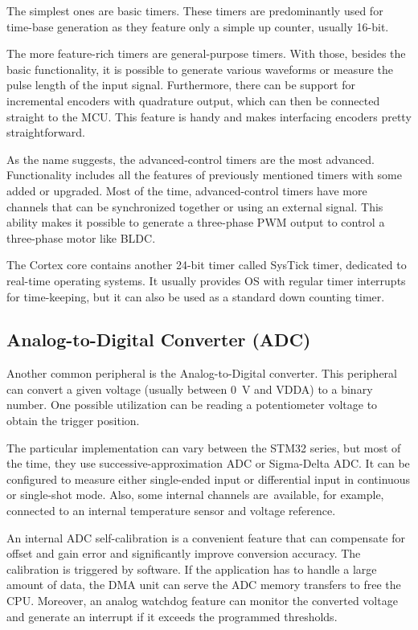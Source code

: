 The simplest ones are basic timers. These timers are predominantly used for time-base generation as they feature only a simple up counter, usually 16-bit.

The more feature-rich timers are general-purpose timers. With those, besides the basic functionality, it is possible to generate various waveforms or measure the pulse length of the input signal. Furthermore, there can be support for incremental encoders with quadrature output, which can then be connected straight to the MCU. This feature is handy and makes interfacing encoders pretty straightforward.

As the name suggests, the advanced-control timers are the most advanced. Functionality includes all the features of previously mentioned timers with some added or upgraded. Most of the time, advanced-control timers have more channels that can be synchronized together or using an external signal. This ability makes it possible to generate a three-phase PWM output to control a three-phase motor like BLDC.

The Cortex core contains another 24-bit timer called SysTick timer, dedicated to real-time operating systems. It usually provides OS with regular timer interrupts for time-keeping, but it can also be used as a standard down counting timer.

	\subsection{Analog-to-Digital Converter (ADC)}
	\label{sub:st_adc}
Another common peripheral is the Analog-to-Digital converter. This peripheral can convert a given voltage (usually between \SI{0}{\V} and VDDA) to a binary number. One possible utilization can be reading a potentiometer voltage to obtain the trigger position.

The particular implementation can vary between the STM32 series, but most of the time, they use successive-approximation ADC or Sigma-Delta ADC. It can be configured to measure either single-ended input or differential input in continuous or single-shot mode. Also, some internal channels are~available, for example, connected to an internal temperature sensor and voltage reference.

An internal ADC self-calibration is a convenient feature that can compensate for offset and gain error and significantly improve conversion accuracy. The calibration is triggered by software. If the application has to handle a large amount of data, the DMA unit can serve the ADC memory transfers to free the CPU. Moreover, an analog watchdog feature can monitor the converted voltage and generate an interrupt if it exceeds the programmed thresholds. 

